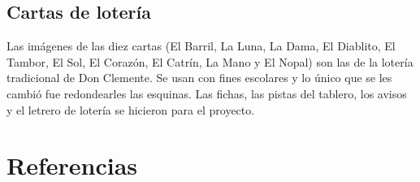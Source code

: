 \documentclass[11pt,a4paper]{article}
\begin{document}
\subsection{Cartas de lotería}

Las imágenes de las diez cartas (El Barril, La Luna, La Dama, El Diablito, El Tambor, El Sol, El Corazón, El Catrín, La Mano y El Nopal) son las de la lotería tradicional de Don Clemente. Se usan con fines escolares y lo único que se les cambió fue redondearles las esquinas. Las fichas, las pistas del tablero, los avisos y el letrero de lotería se hicieron para el proyecto.

\section{Referencias}
\end{document}

